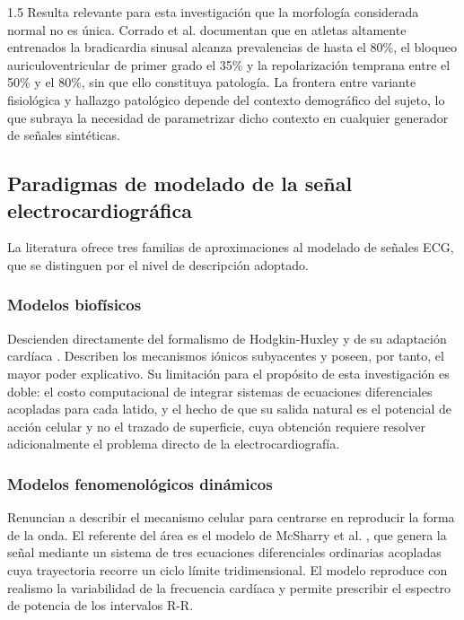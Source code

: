 \begin{spacing}{1.5}
Resulta relevante para esta investigación que la morfología considerada normal no es única. Corrado et al. \cite{corrado2009twelve} documentan que en atletas altamente entrenados la bradicardia sinusal alcanza prevalencias de hasta el 80\%, el bloqueo auriculoventricular de primer grado el 35\% y la repolarización temprana entre el 50\% y el 80\%, sin que ello constituya patología. La frontera entre variante fisiológica y hallazgo patológico depende del contexto demográfico del sujeto, lo que subraya la necesidad de parametrizar dicho contexto en cualquier generador de señales sintéticas.

\subsection{Paradigmas de modelado de la señal electrocardiográfica}

La literatura ofrece tres familias de aproximaciones al modelado de señales ECG, que se distinguen por el nivel de descripción adoptado.

\subsubsection{Modelos biofísicos}

Descienden directamente del formalismo de Hodgkin-Huxley \cite{hodgkin1952quantitative} y de su adaptación cardíaca \cite{noble1962modification}. Describen los mecanismos iónicos subyacentes y poseen, por tanto, el mayor poder explicativo. Su limitación para el propósito de esta investigación es doble: el costo computacional de integrar sistemas de ecuaciones diferenciales acopladas para cada latido, y el hecho de que su salida natural es el potencial de acción celular y no el trazado de superficie, cuya obtención requiere resolver adicionalmente el problema directo de la electrocardiografía.

\subsubsection{Modelos fenomenológicos dinámicos}

Renuncian a describir el mecanismo celular para centrarse en reproducir la forma de la onda. El referente del área es el modelo de McSharry et al. \cite{mcsharry2003dynamical}, que genera la señal mediante un sistema de tres ecuaciones diferenciales ordinarias acopladas cuya trayectoria recorre un ciclo límite tridimensional. El modelo reproduce con realismo la variabilidad de la frecuencia cardíaca y permite prescribir el espectro de potencia de los intervalos R-R.


\end{spacing}
